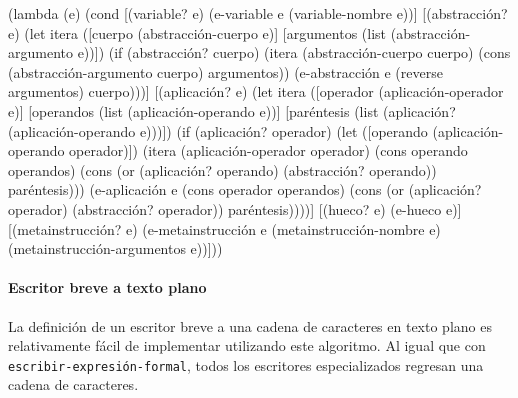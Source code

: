 \documentclass[10pt,oneside,openany,letterpaper]{book}
\begin{document}
\nwenddocs{}\endmoddef
(lambda (e)
  (cond [(variable? e)
         (e-variable e (variable-nombre e))]
        [(abstracción? e)
         (let itera ([cuerpo (abstracción-cuerpo e)]
                     [argumentos (list (abstracción-argumento e))])
           (if (abstracción? cuerpo)
               (itera (abstracción-cuerpo cuerpo)
                      (cons (abstracción-argumento cuerpo)
                            argumentos))
               (e-abstracción e (reverse argumentos) cuerpo)))]
        [(aplicación? e)
         (let itera ([operador (aplicación-operador e)]
                     [operandos (list (aplicación-operando e))]
                     [paréntesis (list (aplicación? (aplicación-operando e)))])
           (if (aplicación? operador)
               (let ([operando (aplicación-operando operador)])
                 (itera (aplicación-operador operador)
                        (cons operando operandos)
                        (cons (or (aplicación? operando)
                                  (abstracción? operando))
                              paréntesis)))
               (e-aplicación e (cons operador operandos)
                             (cons (or (aplicación? operador)
                                       (abstracción? operador))
                                   paréntesis))))]
        [(hueco? e)
         (e-hueco e)]
        [(metainstrucción? e)
         (e-metainstrucción e (metainstrucción-nombre e)
                            (metainstrucción-argumentos e))]))
                
\nwendcode{}\nwdocspar

\paragraph{Escritor breve a texto plano} La definición de un escritor breve a una cadena de caracteres en texto plano es relativamente fácil de implementar utilizando este algoritmo. Al igual que con {\tt{}\protect{}escribir-expresión-formal}, todos los escritores especializados regresan una cadena de caracteres.
\end{document}
